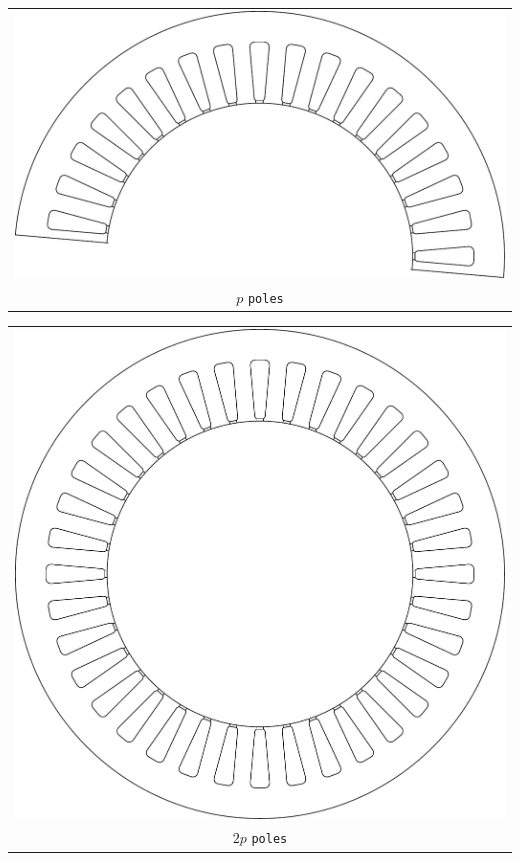\documentclass[a4paper,11pt,oneside]{report}
\begin{document}
\begin{tabular}{c}
\includegraphics[scale=0.75]{../examples/stators/ppole} 
\\
$ p $ \texttt{poles}
\end{tabular}
\vspace{5mm}

\begin{tabular}{c}
\includegraphics[scale=0.75]{../examples/stators/2ppole}
 
\\
$ 2p $ \texttt{poles}
\end{tabular}
\end{document}
